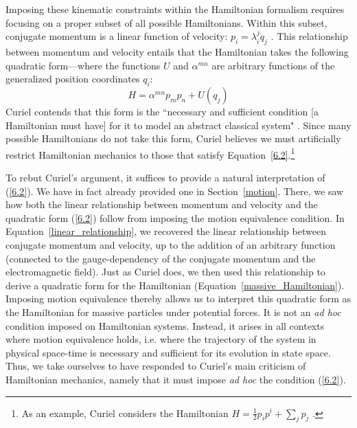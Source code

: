 \documentclass[letterpaper]{article}
\begin{document}
Imposing these kinematic constraints within the Hamiltonian formalism requires focusing on a proper subset of all possible Hamiltonians. Within this subset, conjugate momentum is a linear function of velocity: $p_i = \lambda^j_i \dot{q}_j $ \parencites*[304]{Curiel}. This relationship between momentum and velocity entails that the Hamiltonian takes the following quadratic form---where the functions $U$ and $\alpha^{m n}$ are arbitrary functions of the generalized position coordinates $q_i$:
\begin{equation} \label{6.2}
H =\alpha^{m n} p_m p_n + U (q_j) 
\end{equation}
Curiel contends that this form is the ``necessary and sufficient condition [a Hamiltonian must have] for it to model an abstract classical system" \parencites*[305]{Curiel}. Since many possible Hamiltonians do not take this form, Curiel believes we must artificially restrict Hamiltonian mechanics to those that satisfy Equation~\ref{6.2}.\footnote{As an example, Curiel considers the Hamiltonian $H = \frac{1}{2} p_i p^i + \sum_j p_j$  \parencites*[305]{Curiel}.}

To rebut Curiel's argument, it suffices to provide a natural interpretation of (\ref{6.2}). We have in fact already provided one in Section~\ref{motion}. There, we saw how both the linear relationship between momentum and velocity and the quadratic form (\ref{6.2}) follow from imposing the motion equivalence condition. In Equation~\ref{linear_relationship}, we recovered the linear relationship between conjugate momentum and velocity, up to the addition of an arbitrary function (connected to the gauge-dependency of the conjugate momentum and the electromagnetic field). Just as Curiel does, we then used this relationship to derive a quadratic form for the Hamiltonian (Equation~\ref{massive_Hamiltonian}). Imposing motion equivalence thereby allows us to interpret this quadratic form as the Hamiltonian for massive particles under potential forces. It is not an \textit{ad hoc} condition imposed on Hamiltonian systems. Instead, it arises in all contexts where motion equivalence holds, i.e. where the trajectory of the system in physical space-time is necessary and sufficient for its evolution in state space. Thus, we take ourselves to have responded to Curiel's main criticism of Hamiltonian mechanics, namely that it must impose \textit{ad hoc} the condition (\ref{6.2}). 
\end{document}
